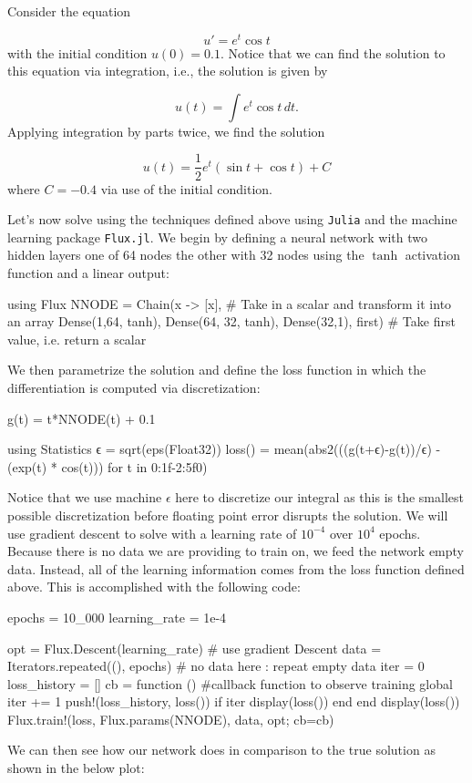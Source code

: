 \documentclass{CUP-JNL-DTM}%
\theoremstyle{definition}
\numberwithin{equation}{section}
\newcommand{\Julia}{\texttt{Julia} }
\begin{document}
Consider the equation

\begin{equation}
	u' = e^t \cos t
\end{equation}
with the initial condition $u(0) = 0.1$. Notice that we can find the solution to this equation via integration, i.e., the solution is given by

\begin{equation}
	u(t) = \int e^t \cos t \, dt. 
\end{equation}
Applying integration by parts twice, we find the solution

\begin{equation}
	u(t) = \frac{1}{2}e^t(\sin t + \cos t) + C
\end{equation}
where $C = -0.4$ via use of the initial condition. 

Let's now solve using the techniques defined above using \Julia and the machine learning package \texttt{Flux.jl}. We begin by defining a neural network with two hidden layers one of 64 nodes the other with 32 nodes using the $\tanh$ activation function and a linear output: 

\begin{jllisting}
using Flux
NNODE = Chain(x -> [x], # Take in a scalar and transform it into an array
           Dense(1,64, tanh),
           Dense(64, 32, tanh),
           Dense(32,1),
           first) # Take first value, i.e. return a scalar
\end{jllisting}
We then parametrize the solution and define the loss function in which the differentiation is computed via discretization:

\begin{jllisting}
g(t) = t*NNODE(t) + 0.1

using Statistics
ϵ = sqrt(eps(Float32))
loss() = mean(abs2(((g(t+ϵ)-g(t))/ϵ) - (exp(t) * cos(t))) for t in 0:1f-2:5f0)
\end{jllisting}
Notice that we use machine $\epsilon$ here to discretize our integral as this is the smallest possible discretization before floating point error disrupts the solution. We will use gradient descent to solve with a learning rate of $10^{-4}$ over $10^4$ epochs. Because there is no data we are providing to train on, we feed the network empty data. Instead, all of the learning information comes from the loss function defined above. This is accomplished with the following code:

\begin{jllisting}
epochs = 10_000
learning_rate = 1e-4

opt = Flux.Descent(learning_rate) # use gradient Descent
data = Iterators.repeated((), epochs) # no data here : repeat empty data
iter = 0
loss_history = []
cb = function () #callback function to observe training
  global iter += 1
  push!(loss_history, loss())
  if iter %
    display(loss())
  end
end
display(loss())
Flux.train!(loss, Flux.params(NNODE), data, opt; cb=cb)
\end{jllisting}
We can then see how our network does in comparison to the true solution as shown in the below plot:
\end{document}
